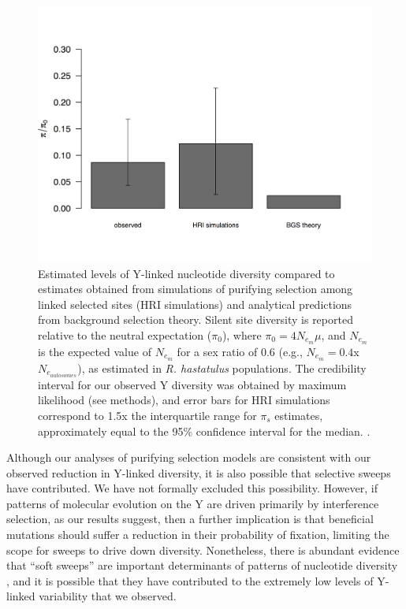 \documentclass[9pt,twocolumn,twoside]{gsajnl}
\begin{document}
\begin{figure}[t!]
\centering
\noindent
\includegraphics[width=\linewidth]{figure4.jpg}
\caption{Estimated levels of Y-linked nucleotide diversity compared to estimates obtained from simulations of purifying selection among linked selected sites (HRI simulations) and analytical predictions from background selection theory. Silent site diversity is reported relative to the neutral expectation ($\pi_{0}$), where $\pi_{0} =4N_{e}_{m}\mu$, and $N_{e}_{m}$ is the expected value of $N_{e}_{m}$ for a sex ratio of 0.6 (e.g., $N_{e}_{m} = 0.4$x$N_{e}_{autosomes}$), as estimated in \textit{R. hastatulus} populations. The credibility interval for our observed Y diversity was obtained by maximum likelihood (see methods), and error bars for HRI simulations correspond to 1.5x the interquartile range for $\pi_{s}$ estimates, approximately equal to the 95\% confidence interval for the median. \citep{chambers1983graphical}.
}
\label{fig:ydiversity}
\end{figure}

Although our analyses of purifying selection models are consistent with our observed reduction in Y-linked diversity, it is also possible that selective sweeps have contributed. We have not formally excluded this possibility. However, if patterns of molecular evolution on the Y are driven primarily by interference selection, as our results suggest, then a further implication is that beneficial mutations should suffer a reduction in their probability of fixation, limiting the scope for sweeps to drive down diversity. Nonetheless, there is abundant evidence that “soft sweeps” are important determinants of patterns of nucleotide diversity \citep{messer2013population}, and it is possible that they have contributed to the extremely low levels of Y-linked variability that we observed.
\end{document}
